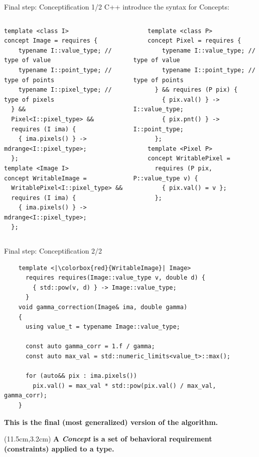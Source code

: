 \documentclass[12pt,aspectratio=169]{beamer}
\begin{document}
\begin{frame}[fragile]{Final step: Conceptification 1/2}
  C++ introduce the syntax for Concepts:
  \begin{columns}[T,onlytextwidth]
    \begin{verbatim}
template <class I>
concept Image = requires {
    typename I::value_type; // type of value
    typename I::point_type; // type of points
    typename I::pixel_type; // type of pixels
  } &&
  Pixel<I::pixel_type> &&
  requires (I ima) {
    { ima.pixels() } -> mdrange<I::pixel_type>;
  };
template <Image I>
concept WritableImage = 
  WritablePixel<I::pixel_type> &&
  requires (I ima) {
    { ima.pixels() } -> mdrange<I::pixel_type>;
  };
  \end{verbatim}

    \begin{verbatim}
    template <class P>
    concept Pixel = requires {
        typename I::value_type; // type of value
        typename I::point_type; // type of points
      } && requires (P pix) {
        { pix.val() } -> I::value_type;
        { pix.pnt() } -> I::point_type;
      };
    template <Pixel P>
    concept WritablePixel = 
      requires (P pix, P::value_type v) {
        { pix.val() = v };
      };
  \end{verbatim}
  \end{columns}
\end{frame}

\begin{frame}[fragile]{Final step: Conceptification 2/2}
  \begin{verbatim}
    template <|\colorbox{red}{WritableImage}| Image>
      requires requires(Image::value_type v, double d) {
        { std::pow(v, d) } -> Image::value_type;
      }
    void gamma_correction(Image& ima, double gamma)
    {
      using value_t = typename Image::value_type;
    
      const auto gamma_corr = 1.f / gamma;
      const auto max_val = std::numeric_limits<value_t>::max();
    
      for (auto&& pix : ima.pixels())
        pix.val() = max_val * std::pow(pix.val() / max_val, gamma_corr);
    }
  \end{verbatim}
  \vfill
  \begin{center}\textbf{This is the final (most generalized) version of the algorithm.}\end{center}
  \begin{textblock*}{4cm}(11.5cm,3.2cm)
    \textbf{A \emph{Concept} is a set of behavioral requirement (constraints) applied to a type.}
  \end{textblock*}
\end{frame}
\end{document}
